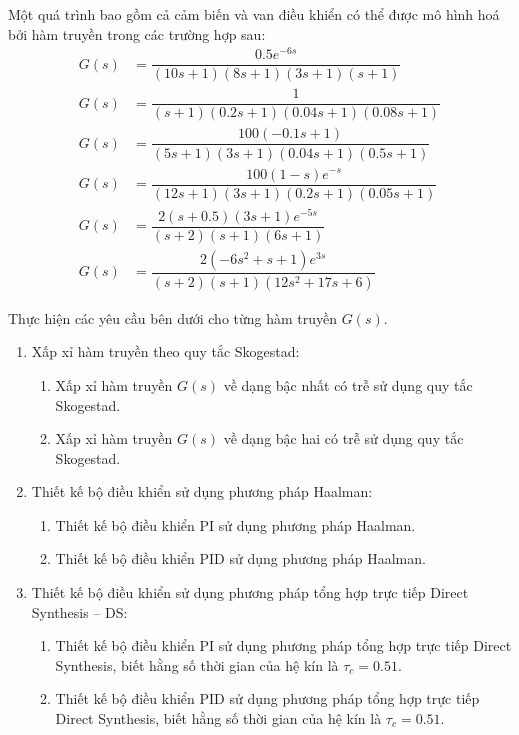 \begin{exercise}
    Một quá trình bao gồm cả cảm biến và van điều khiển có thể được mô hình hoá bởi hàm truyền trong các trường hợp sau:
        \begin{align*}
            G(s) & = \dfrac{0.5e^{-6s}}{(10s + 1)(8s + 1)(3s+1)(s+1)} \\
            G(s) & = \dfrac{1}{(s + 1)(0.2s + 1)(0.04s+1)(0.08s+1)} \\
            G(s) & = \dfrac{100(-0.1s + 1)}{(5s + 1)(3s + 1)(0.04s+1)(0.5s+1)} \\
            G(s) & = \dfrac{100(1 - s) e^{-s}}{(12s + 1)(3s + 1)(0.2s+1)(0.05s+1)} \\
            G(s) & = \dfrac{2(s + 0.5)(3s + 1) e^{-5s}}{(s + 2)(s + 1)(6s + 1)} \\
            G(s) & = \dfrac{2(-6s^2 + s + 1)e^{3s}}{(s + 2)(s + 1)(12s^2 + 17s + 6)}
        \end{align*}

    Thực hiện các yêu cầu bên dưới cho từng hàm truyền $G(s)$.

    \begin{enumerate}
        \item Xấp xỉ hàm truyền theo quy tắc Skogestad:
            \begin{enumerate}
                \item Xấp xỉ hàm truyền $G(s)$ về dạng bậc nhất có trễ sử dụng quy tắc Skogestad.
                \item Xấp xỉ hàm truyền $G(s)$ về dạng bậc hai có trễ sử dụng quy tắc Skogestad.
            \end{enumerate}

        \item Thiết kế bộ điều khiển sử dụng phương pháp Haalman:
            \begin{enumerate}
                \item Thiết kế bộ điều khiển PI sử dụng phương pháp Haalman.
                \item Thiết kế bộ điều khiển PID sử dụng phương pháp Haalman.
            \end{enumerate}

        \item Thiết kế bộ điều khiển sử dụng phương pháp tổng hợp trực tiếp Direct Synthesis -- DS:
            \begin{enumerate}
                \item Thiết kế bộ điều khiển PI sử dụng phương pháp tổng hợp trực tiếp Direct Synthesis, biết hằng số thời gian của hệ kín là $\tau_c = 0.51$.

                \item Thiết kế bộ điều khiển PID sử dụng phương pháp tổng hợp trực tiếp Direct Synthesis, biết hằng số thời gian của hệ kín là $\tau_c = 0.51$.
            \end{enumerate}
    \end{enumerate}
\end{exercise}
